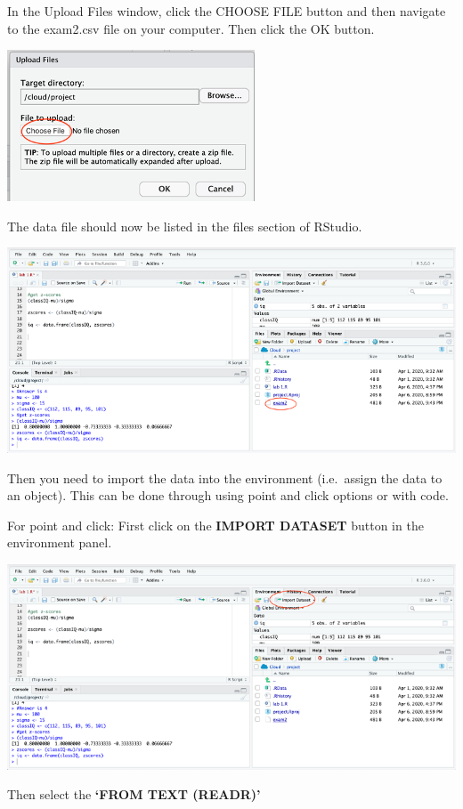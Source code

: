 \documentclass[
]{book}
\begin{document}
In the Upload Files window, click the CHOOSE FILE button and then navigate to the exam2.csv file on your computer. Then click the OK button.

\includegraphics{img/choosefile.png}

The data file should now be listed in the files section of RStudio.

\includegraphics{img/filelist.png}

Then you need to import the data into the environment (i.e.~assign the data to an object). This can be done through using point and click options or with code.

For point and click:
First click on the \textbf{IMPORT DATASET} button in the environment panel.

\includegraphics{img/import.png}

Then select the \textbf{`FROM TEXT (READR)'}
\end{document}
